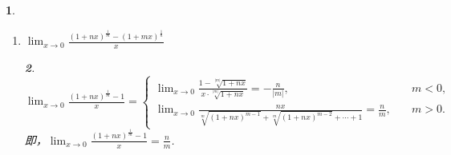 \documentclass[utf8]{book}
\newtheorem{example}{}[section]             %
\newtheorem{solution}{}
\begin{document}
\begin{example}
\begin{enumerate}
\begin{solution}
\begin{enumerate}
$\displaystyle\lim_{x\to 0}\frac{(1+mx)^n-(1+nx)^m}{x^2}=n^2m^2-C^2_{|n|}m^2-C^2_mn^2$.
\item 当$m<0, n>0$时，$$(1+mx)^n-(1+nx)^m =\frac{(1+mx)^n(1+nx)^{|m|}-1}{(1+nx)^{|m|}}.$$于是，
$\displaystyle\lim_{x\to 0}\frac{(1+mx)^n-(1+nx)^m}{x^2}=C^2_{n}m^2+C^2_{|m|}n^2-n^2m^2$.
\item 当$m>0,n>0$时，$$(1+mx)^n-(1+nx)^m = (C^2_nm^2-C^2_mn^2)x^2+\cdots.$$于是，
$\displaystyle\lim_{x\to 0}\frac{(1+mx)^n-(1+nx)^m}{x^2}=C^2_nm^2-C^2_mn^2$.
\item 当$m<0,n<0$时，$$(1+mx)^n-(1+nx)^m =\frac{(1+nx)^{|m|}-(1+mx)^{|n|}}{(1+mx)^{|n|}(1+nx)^{|m|}}=\frac{(C^2_{|m|}n^2-C^2_{|n|}m^2)x^2+\cdots}{(1+mx)^{|n|}(1+nx)^{|m|}}.$$于是，
$\displaystyle\lim_{x\to 0}\frac{(1+mx)^n-(1+nx)^m}{x^2}=C^2_{|m|}n^2-C^2_{|n|}m^2$.
\end{enumerate}
\end{solution}
\item $\displaystyle\lim_{x\to 0}\frac{(1+nx)^{\frac{1}{m}}-(1+mx)^{\frac{1}{n}}}{x}$
\begin{solution}
$\displaystyle\lim_{x\to 0}\frac{(1+nx)^{\frac{1}{m}}-1}{x}=
\begin{cases}
\displaystyle\lim_{x\to 0}\frac{1-\sqrt[|m|]{1+nx}}{x\cdot\sqrt[|m|]{1+nx}}=-\frac{n}{|m|},\quad&m<0,\\
\displaystyle\lim_{x\to 0}\frac{nx}{\sqrt[m]{(1+nx)^{m-1}}+\sqrt[m]{(1+nx)^{m-2}}+\cdots + 1}=\frac{n}{m},\quad&m>0.
\end{cases}$
即，$\displaystyle\lim_{x\to 0}\frac{(1+nx)^{\frac{1}{m}}-1}{x}=\frac{n}{m}$.


\end{solution}
\end{enumerate}
\end{example}
\end{document}
